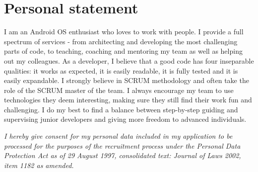\documentclass[letterpaper]{twentysecondcv} %
\begin{document}

\section{Personal statement}

I am an Android OS enthusiast who loves to work with people. I provide a full spectrum of services - from architecting and developing the most challenging parts of code, to teaching, coaching and mentoring my team as well as helping out my colleagues. As a developer, I believe that a good code has four inseparable qualities: it works as expected, it is easily readable, it is fully tested and it is easily expandable. I strongly believe in SCRUM methodology and often take the role of the SCRUM master of the team. I always encourage my team to use technologies they deem interesting, making sure they still find their work fun and challenging. I do my best to find a balance between step-by-step guiding and supervising junior developers and giving more freedom to advanced individuals.


\pagebreak
{}
\setlength{\parindent}{15pt} 

\par \large \textit{I hereby give consent for my personal data included in my application to be processed for the purposes of the recruitment process under the Personal Data Protection Act as of 29 August 1997, consolidated text: Journal of Laws 2002, item 1182 as amended.}
\end{document}
